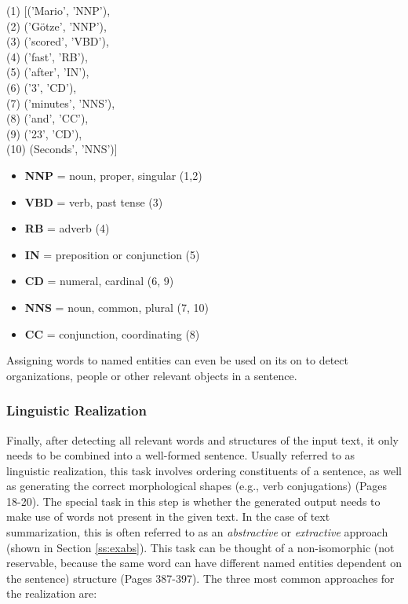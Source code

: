 \begin{tcolorbox}\label{box:1}
	\begin{flushleft}
		(1) [('Mario', 'NNP'), \\
		(2) ('Götze', 'NNP'), \\
		(3) ('scored', 'VBD'),\\
		(4) ('fast', 'RB'),\\
		(5) ('after', 'IN'),\\
		(6) ('3', 'CD'),\\
		(7) ('minutes', 'NNS'), \\
		(8) ('and', 'CC'),\\
		(9) ('23', 'CD'),\\
		(10) (Seconds', 'NNS')]
	\end{flushleft}
	
	\begin{itemize}
		\item \textbf{NNP} = noun, proper, singular (1,2)
		\item \textbf{VBD} = verb, past tense (3)
		\item \textbf{RB} = adverb (4)
		\item \textbf{IN} = preposition or conjunction (5)
		\item \textbf{CD} = numeral, cardinal (6, 9)
		\item \textbf{NNS} = noun, common, plural (7, 10)
		\item \textbf{CC} = conjunction, coordinating (8)
	\end{itemize}
\end{tcolorbox}

Assigning words to named entities can even be used on its on to detect organizations, people or other relevant objects in a sentence.

\subsubsection{Linguistic Realization}

Finally, after detecting all relevant words and structures of the input text, it only needs to be combined into a well-formed sentence. Usually referred to as linguistic realization, this task involves ordering constituents of a sentence, as well as generating the correct morphological shapes (e.g., verb conjugations) \cite{gatt} (Pages 18-20). The special task in this step is whether the generated output needs to make use of words not present in the given text. In the case of text summarization, this is often referred to as an \textit{abstractive} or \textit{extractive} approach (shown in Section \ref{ss:exabs}). This task can be thought of a non-isomorphic (not reservable, because the same word can have different named entities dependent on the sentence) structure \cite{ballesteros-etal-2015-data} (Pages 387-397). The three most common approaches for the realization are: \\


